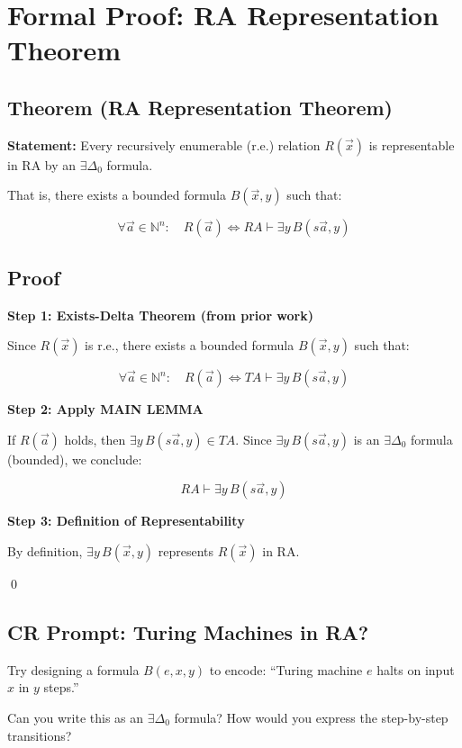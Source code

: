 \documentclass[12pt]{article}
\begin{document}
\section{Formal Proof: RA Representation Theorem}

\subsection{Theorem (RA Representation Theorem)}

\textbf{Statement:} Every recursively enumerable (r.e.) relation \( R(\vec{x}) \) is representable in RA by an \( \exists \Delta_0 \) formula.

That is, there exists a bounded formula \( B(\vec{x}, y) \) such that:

\[
\forall \vec{a} \in \mathbb{N}^n: \quad R(\vec{a}) \iff RA \vdash \exists y\, B(s\vec{a}, y)
\]

\subsection{Proof}

\textbf{Step 1: Exists-Delta Theorem (from prior work)}

Since \( R(\vec{x}) \) is r.e., there exists a bounded formula \( B(\vec{x}, y) \) such that:

\[
\forall \vec{a} \in \mathbb{N}^n: \quad R(\vec{a}) \iff TA \vdash \exists y\, B(s\vec{a}, y)
\]

\textbf{Step 2: Apply MAIN LEMMA}

If \( R(\vec{a}) \) holds, then \( \exists y\, B(s\vec{a}, y) \in TA \). Since \( \exists y\, B(s\vec{a}, y) \) is an \( \exists \Delta_0 \) formula (bounded), we conclude:

\[
RA \vdash \exists y\, B(s\vec{a}, y)
\]

\textbf{Step 3: Definition of Representability}

By definition, \( \exists y\, B(\vec{x}, y) \) represents \( R(\vec{x}) \) in RA.

\qed

\subsection*{CR Prompt: Turing Machines in RA?}

Try designing a formula \( B(e, x, y) \) to encode: “Turing machine \( e \) halts on input \( x \) in \( y \) steps.”

Can you write this as an \( \exists \Delta_0 \) formula? How would you express the step-by-step transitions?
\end{document}
